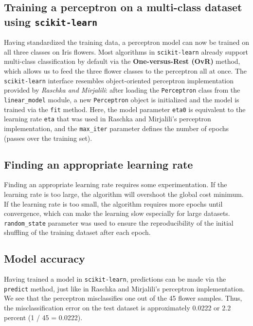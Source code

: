 \documentclass[11pt]{article}
\begin{document}
    \subsection{Training a perceptron on a multi-class dataset using \texttt{scikit-learn}} \label{subsec:perc_sklearn}

    Having standardized the training data, a perceptron model can now be trained on all three classes on Iris flowers.
    Most algorithms in \texttt{scikit-learn} already support multi-class classification by default via the \textbf{One-versus-Rest (OvR)} method, which allows us to feed the three flower classes to the perceptron all at once.
    The \texttt{scikit-learn} interface resembles object-oriented perceptron implementation provided by \textit{Raschka and Mirjalili}\cite{RaschkaMirjalili2017}: after loading the \texttt{Perceptron} class from the \texttt{linear\_model} module, a new \texttt{Perceptron} object is initialized and the model is trained via the \texttt{fit} method.
    Here, the model parameter \texttt{eta0} is equivalent to the learning rate \texttt{eta} that was used in Raschka and Mirjalili's perceptron implementation, and the \texttt{max\_iter} parameter defines the number of epochs (passes over the training set).

    \subsection{Finding an appropriate learning rate} \label{subsec:perc_learn_rate}

    Finding an appropriate learning rate requires some experimentation.
    If the learning rate is too large, the algorithm will overshoot the global cost minimum.
    If the learning rate is too small, the algorithm requires more epochs until convergence, which can make the learning slow \textemdash especially for large datasets.
    \texttt{random\_state} parameter was used to ensure the reproducibility of the initial shuffling of the training dataset after each epoch.

    \subsection{Model accuracy} \label{subsec:perc_accuracy}
    Having trained a model in \texttt{scikit-learn}, predictions can be made via the \texttt{predict} method, just like in Raschka and Mirjalili's perceptron implementation.
    We see that the perceptron misclassifies one out of the 45 flower samples.
    Thus, the misclassification error on the test dataset is approximately 0.0222 or 2.2 percent (1 / 45 = 0.0222).
\end{document}

